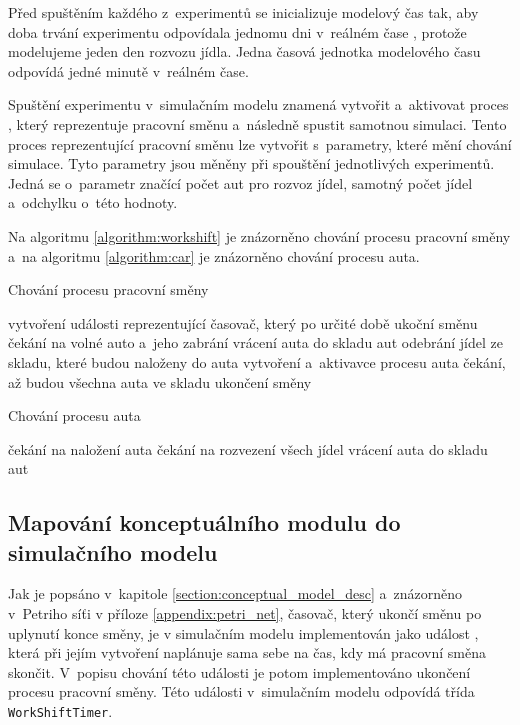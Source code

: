 \documentclass[a4paper, 11pt]{article}
\begin{document}
	Před spuštěním každého z~experimentů se inicializuje modelový čas tak, aby
	doba trvání experimentu odpovídala jednomu dni v~reálném čase
	\cite[snímek 21]{IMS_slides}, protože modelujeme jeden den rozvozu jídla.
	Jedna časová jednotka modelového času odpovídá jedné minutě v~reálném
	čase.

	Spuštění experimentu v~simulačním modelu znamená vytvořit a~aktivovat
	proces \cite[snímek 121]{IMS_slides}, který reprezentuje pracovní směnu
	a~následně spustit samotnou simulaci. Tento proces reprezentující
	pracovní směnu lze vytvořit s~parametry, které mění chování simulace.
	Tyto parametry jsou měněny při spouštění jednotlivých experimentů. Jedná
	se o~parametr značící počet aut pro rozvoz jídel, samotný počet jídel
	a~odchylku o~této hodnoty.

	Na algoritmu \ref{algorithm:workshift} je znázorněno chování procesu
	pracovní směny a~na algoritmu \ref{algorithm:car} je znázorněno chování
	procesu auta.\\

	\begin{algorithm}[H]
		\caption{Chování procesu pracovní směny}
		\label{algorithm:workshift}

		vytvoření události reprezentující časovač, který po určité době
		ukoční směnu\;
		{
			čekání na volné auto a~jeho zabrání\;
			{
				vrácení auta do skladu aut\;
				\Break\;
			}
			{
				odebrání jídel ze skladu, které budou naloženy do auta\;
				vytvoření a~aktivavce procesu auta\;
			}
		}
		čekání, až budou všechna auta ve skladu\;
		ukončení směny\;
	\end{algorithm}

	\begin{algorithm}[H]
		\caption{Chování procesu auta}
		\label{algorithm:car}

		čekání na naložení auta\;
		čekání na rozvezení všech jídel\;
		vrácení auta do skladu aut\;
	\end{algorithm}


	\subsection{Mapování konceptuálního modulu do simulačního modelu}

	Jak je popsáno v~kapitole \ref{section:conceptual_model_desc}
	a~znázorněno v~Petriho síťi v příloze \ref{appendix:petri_net}, časovač,
	který ukončí směnu po uplynutí konce směny, je v simulačním modelu
	implementován jako událost \cite[snímek 169]{IMS_slides}, která
	při jejím vytvoření naplánuje sama sebe na čas, kdy má pracovní směna
	skončit. V~popisu chování této události je potom implementováno
	ukončení procesu pracovní směny. Této události v~simulačním modelu
	odpovídá třída \texttt{WorkShiftTimer}.
\end{document}
